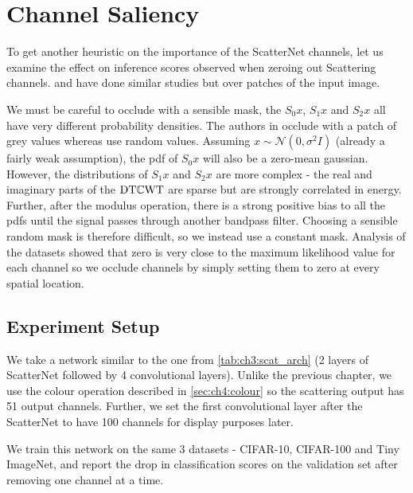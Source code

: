 \section{Channel Saliency}\label{sec:ch4:occlusion}
To get another heuristic on the importance of the ScatterNet channels, let us examine
the effect on inference scores observed when zeroing out Scattering channels.
\citeauthor{zeiler_visualizing_2014} \cite{zeiler_visualizing_2014} and 
\citeauthor{zhou_object_2014} \cite{zhou_object_2014} have done similar studies but
over patches of the input image. 

We must be careful to occlude with a sensible mask, the $S_0x$, $S_1x$ and $S_2x$
all have very different probability densities. The authors in \cite{zeiler_visualizing_2014}
occlude with a patch of grey values whereas \cite{zhou_object_2014} use random
values. Assuming $x \sim \mathcal{N}(0, \sigma^2I)$ (already a fairly weak
assumption), the pdf of $S_0x$ will also be a zero-mean gaussian. However, the
distributions of $S_1x$ and $S_2x$ are more complex - the real and imaginary
parts of the $\mathrm{DT}\mathbb{C}\mathrm{WT}$ are sparse but are strongly correlated in energy. Further,
after the modulus operation, there is a strong positive bias to all the pdfs
until the signal passes through another bandpass filter. Choosing a sensible
random mask is therefore difficult, so we instead use a constant mask. Analysis
of the datasets showed that zero is very close to the maximum likelihood value for
each channel so we occlude channels by simply setting them to zero at every
spatial location.

\subsection{Experiment Setup}
We take a network similar to the one from
\autoref{tab:ch3:scat_arch} (2 layers of ScatterNet followed by 4 convolutional
layers). Unlike the previous chapter, we use the colour operation described in 
\autoref{sec:ch4:colour} so the scattering output has 51 output channels. Further,
we set the first convolutional layer after the ScatterNet to have 
100 channels for display purposes later. 

We train this network on the same 3 datasets - CIFAR-10, CIFAR-100 and Tiny ImageNet, and report the
drop in classification scores on the validation set after removing one channel at
a time. 

